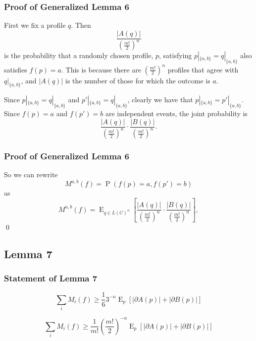 \documentclass[aspectratio=169]{beamer}
\DeclareMathOperator{\probability}{P}
\DeclareMathOperator{\expectedvalue}{E}
\begin{document}
		\begin{frame}
			\frametitle{Proof of Generalized Lemma 6}

			First we fix a profile $q$. Then
			\[
				\frac{|A(q)|}{\left(\frac{m!}{2}\right)^n}
			\]
			is the probability that a randomly chosen profile, $p$, satisfying $p|_{\{a,b\}} = q|_{\{a,b\}}$ also satisfies $f(p) = a$. This is because there are $(\frac{m!}{2})^n$ profiles that agree with $q|_{\{a,b\}}$, and $|A(q)|$ is the number of those for which the outcome is $a$.

			Since $p|_{\{a,b\}} = q|_{\{a,b\}}$ and $p'|_{\{a,b\}} = q|_{\{a,b\}}$, clearly we have that $p|_{\{a,b\}} = p'|_{\{a,b\}}$. Since $f(p) = a$ and $f(p') = b$ are independent events, the joint probability is
			\[
				\frac{|A(q)|}{\left(\frac{m!}{2}\right)^n} \cdot \frac{|B(q)|}{\left(\frac{m!}{2}\right)^n}.
			\]
		\end{frame}

		\begin{frame}
			\frametitle{Proof of Generalized Lemma 6}

			So we can rewrite
			\[
				M^{a,b}(f) = \probability(f(p) = a, f(p') = b)
			\]
			as
			\[
				M^{a,b}(f) = \expectedvalue_{q \in L(C)^n} \left[ \frac{|A(q)|}{\left(\frac{m!}{2}\right)^n} \cdot \frac{|B(q)|}{\left(\frac{m!}{2}\right)^n} \right],
			\]
			\qed
		\end{frame}


	\subsection{Lemma 7}

		\begin{frame}
			\frametitle{Statement of Lemma 7}

			\begin{lemma}
				\[
					\sum_i M_i(f) \ge \frac{1}{6} 3^{-n} \expectedvalue_p \left[|\partial A(p)| + |\partial B(p)| \right]
				\]
			\end{lemma}

			\begin{lemma}
				\[
					\sum_i M_i(f) \ge \frac{1}{m!} \left(\frac{m!}{2}\right)^{-n} \expectedvalue_p \left[|\partial A(p)| + |\partial B(p)| \right]
				\]
			\end{lemma}
		\end{frame}
\end{document}
